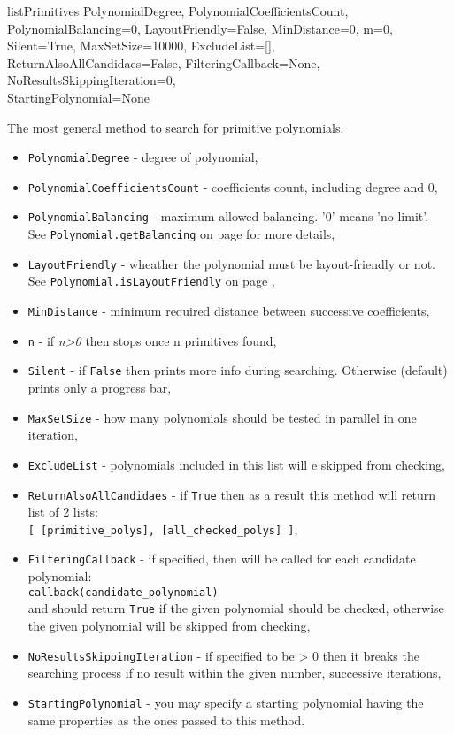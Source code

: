  {listPrimitives} {PolynomialDegree, PolynomialCoefficientsCount, PolynomialBalancing=0, LayoutFriendly=False, MinDistance=0, m=0, Silent=True, MaxSetSize=10000, ExcludeList=[],\\ReturnAlsoAllCandidaes=False, FilteringCallback=None, NoResultsSkippingIteration=0,\\StartingPolynomial=None} {
	The most general method to search for primitive polynomials.
	\begin{itemize}
		\item \texttt{PolynomialDegree} - degree of polynomial,
		\item \texttt{PolynomialCoefficientsCount} - coefficients count, including degree and 0,
		\item \texttt{PolynomialBalancing} - maximum allowed balancing. '0' means 'no limit'. \\See \texttt{Polynomial.getBalancing} on page \pageref{polynomial:getbalancing} for more details,
		\item \texttt{LayoutFriendly} - wheather the polynomial must be layout-friendly or not. \\See \texttt{Polynomial.isLayoutFriendly} on page \pageref{polynomial:islayoutfriendly},
		\item \texttt{MinDistance} - minimum required distance between successive coefficients,
		\item \texttt{n} - if \textit{n>0} then stops once n primitives found,
		\item \texttt{Silent} - if \texttt{False} then prints more info during searching. Otherwise (default) prints only a progress bar,
		\item \texttt{MaxSetSize} - how many polynomials should be tested in parallel in one iteration,
		\item \texttt{ExcludeList} - polynomials included in this list will e skipped from checking,
		\item \texttt{ReturnAlsoAllCandidaes} - if \texttt{True} then as a result this method will return list of 2 lists: \\\texttt{[ [primitive\_polys], [all\_checked\_polys] ]},
		\item \texttt{FilteringCallback} - if specified, then will be called for each candidate polynomial:\\\texttt{callback(candidate\_polynomial)}\\and should return \texttt{True} if the given polynomial should be checked, otherwise the given polynomial will be skipped from checking,
		\item \texttt{NoResultsSkippingIteration} - if specified to be > 0 then it breaks the searching process if no result within the given number, successive iterations,
		\item \texttt{StartingPolynomial} - you may specify a starting polynomial having the same properties as the ones passed to this method.
	\end{itemize}
}

